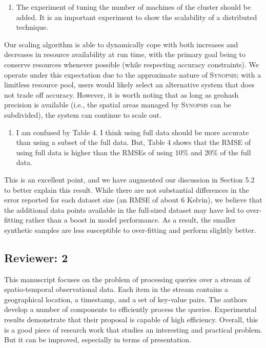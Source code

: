 \documentclass{article}
\begin{document}
\begin{enumerate}
\def\labelenumi{\arabic{enumi})}
\setcounter{enumi}{5}
\item
  The experiment of tuning the number of machines of the cluster should
  be added. It is an important experiment to show the scalability of a
  distributed technique.
\end{enumerate}

\begin{tcolorbox}
    Our scaling algorithm is able to dynamically cope with both increases and decreases in resource availability at run time, with the primary goal being to conserve resources whenever possible (while respecting accuracy constraints). We operate under this expectation due to the approximate nature of \textsc{Synopsis}; with a limitless resource pool, users would likely select an alternative system that does not trade off accuracy. However, it is worth noting that as long as geohash precision is available (i.e., the spatial areas managed by \textsc{Synopsis} can be subdivided), the system can continue to scale out.
\end{tcolorbox}

\begin{enumerate}
\def\labelenumi{\arabic{enumi})}
\setcounter{enumi}{6}
\item
  I am confused by Table 4. I think using full data should be more
  accurate than using a subset of the full data. But, Table 4 shows that
  the RMSE of using full data is higher than the RMSEs of using 10\% and
  20\% of the full data.
\end{enumerate}

\begin{tcolorbox}
This is an excellent point, and we have augmented our discussion in
Section 5.2 to better explain this result. While there are not
substantial differences in the error reported for each dataset size (an
RMSE of about 6 Kelvin), we believe that the additional data points
available in the full-sized dataset may have led to over-fitting rather
than a boost in model performance. As a result, the smaller synthetic
samples are less susceptible to over-fitting and perform slightly
better.
\end{tcolorbox}

\subsection*{Reviewer: 2}\label{reviewer-2}

This manuscript focuses on the problem of processing queries over a
stream of spatio-temporal observational data. Each item in the stream
contains a geographical location, a timestamp, and a set of key-value
pairs. The authors develop a number of components to efficiently process
the queries. Experimental results demonstrate that their proposal is
capable of high efficiency. Overall, this is a good piece of research
work that studies an interesting and practical problem. But it can be
improved, especially in terms of presentation.
\end{document}
